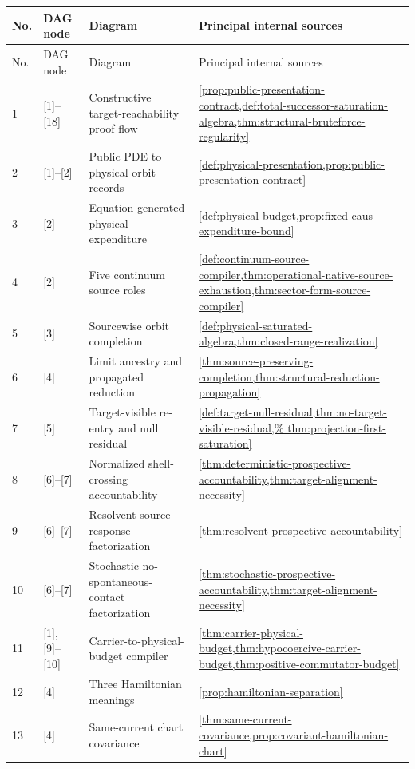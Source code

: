 \documentclass[11pt]{article}
\numberwithin{section}{part}
\theoremstyle{plain}
\theoremstyle{definition}
\theoremstyle{remark}
\begin{document}
\begin{longtable}{p{.055\linewidth}p{.105\linewidth}p{.30\linewidth}p{.43\linewidth}}
\toprule
No. & DAG node & Diagram & Principal internal sources\\
\midrule
\endfirsthead
\toprule
No. & DAG node & Diagram & Principal internal sources\\
\midrule
\endhead
1 & [1]--[18] & Constructive target-reachability proof flow &
\cref{prop:public-presentation-contract,def:total-successor-saturation-algebra,thm:structural-bruteforce-regularity}\\
2 & [1]--[2] & Public PDE to physical orbit records &
\cref{def:physical-presentation,prop:public-presentation-contract}\\
3 & [2] & Equation-generated physical expenditure &
\cref{def:physical-budget,prop:fixed-caus-expenditure-bound}\\
4 & [2] & Five continuum source roles &
\cref{def:continuum-source-compiler,thm:operational-native-source-exhaustion,thm:sector-form-source-compiler}\\
5 & [3] & Sourcewise orbit completion &
\cref{def:physical-saturated-algebra,thm:closed-range-realization}\\
6 & [4] & Limit ancestry and propagated reduction &
\cref{thm:source-preserving-completion,thm:structural-reduction-propagation}\\
7 & [5] & Target-visible re-entry and null residual &
\cref{def:target-null-residual,thm:no-target-visible-residual,%
thm:projection-first-saturation}\\
8 & [6]--[7] & Normalized shell-crossing accountability &
\cref{thm:deterministic-prospective-accountability,thm:target-alignment-necessity}\\
9 & [6]--[7] & Resolvent source-response factorization &
\cref{thm:resolvent-prospective-accountability}\\
10 & [6]--[7] & Stochastic no-spontaneous-contact factorization &
\cref{thm:stochastic-prospective-accountability,thm:target-alignment-necessity}\\
11 & [1], [9]--[10] & Carrier-to-physical-budget compiler &
\cref{thm:carrier-physical-budget,thm:hypocoercive-carrier-budget,thm:positive-commutator-budget}\\
12 & [4] & Three Hamiltonian meanings &
\cref{prop:hamiltonian-separation}\\
13 & [4] & Same-current chart covariance &
\cref{thm:same-current-covariance,prop:covariant-hamiltonian-chart}\\

\end{longtable}
\end{document}
